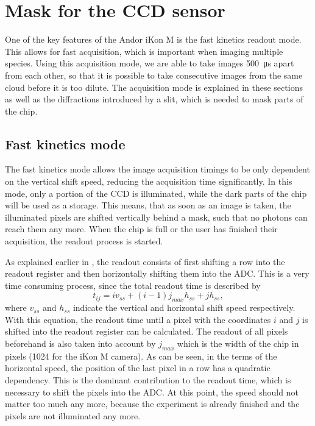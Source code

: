 
\newpage
\section{Mask for the CCD sensor}
One of the key features of the Andor iKon M is the fast kinetics readout mode. This allows for fast acquisition, which is important when imaging multiple species. Using this acquisition mode, we are able to take images \SI{500}{\micro\second} apart from each other, so that it is possible to take consecutive images from the same cloud before it is too dilute.
The acquisition mode is explained in these sections as well as the diffractions introduced by a slit, which is needed to mask parts of the chip.

\subsection{Fast kinetics mode}
\label{ch:fast_kin}
The fast kinetics mode allows the image acquisition timings to be only dependent on the vertical shift speed, reducing the acquisition time significantly. In this mode, only a portion of the CCD is illuminated, while the dark parts of the chip will be used as a storage. This means, that as soon as an image is taken, the illuminated pixels are shifted vertically behind a mask, such that no photons can reach them any more. When the chip is full or the user has finished their acquisition, the readout process is started.

As explained earlier in , the readout consists of first shifting a row into the readout register and then horizontally shifting them into the ADC. This is a very time consuming process, since the total readout time is described by
\begin{equation}
t_{ij} = i v_{ss} + (i-1) j_{max} h_{ss}+j h_{ss},
\end{equation}
where $v_{ss}$ and $h_{ss}$ indicate the vertical and horizontal shift speed respectively.
With this equation, the readout time until a pixel with the coordinates $i$ and $j$ is shifted into the readout register can be calculated. The readout of all pixels beforehand is also taken into account by $j_{max}$ which is the width of the chip in pixels (1024 for the iKon M camera).
As can be seen, in the terms of the horizontal speed, the position of the last pixel in a row has a quadratic dependency. This is the dominant contribution to the readout time, which is necessary to shift the pixels into the ADC. At this point, the speed should not matter too much any more, because the experiment is already finished and the pixels are not illuminated any more.

